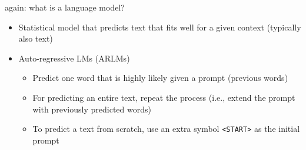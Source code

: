 \begin{frame}{again: what is a language model?}

\vfill

\begin{itemize}
	\item Statistical model that predicts text that fits well for a given context (typically also text)
	\item Auto-regressive LMs (ARLMs)
	\begin{itemize}
		\item Predict one word that is highly likely given a prompt (previous words)
		\item For predicting an entire text, repeat the process (i.e., extend the prompt with previously predicted words)
		\item To predict a text from scratch, use an extra symbol \texttt{<START>} as the initial prompt
	\end{itemize}
\end{itemize}

\vfill

\end{frame}


